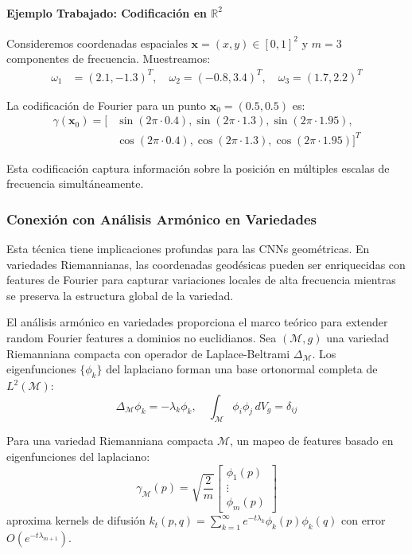 \paragraph{Ejemplo Trabajado: Codificación en $\mathbb{R}^2$}

Consideremos coordenadas espaciales $\mathbf{x} = (x, y) \in [0, 1]^2$ y $m = 3$ componentes de frecuencia. Muestreamos:
\begin{align}
\omega_1 &= (2.1, -1.3)^T, \quad \omega_2 = (-0.8, 3.4)^T, \quad \omega_3 = (1.7, 2.2)^T
\end{align}

La codificación de Fourier para un punto $\mathbf{x}_0 = (0.5, 0.5)$ es:
\begin{align}
\gamma(\mathbf{x}_0) = [&\sin(2\pi \cdot 0.4), \sin(2\pi \cdot 1.3), \sin(2\pi \cdot 1.95), \\
&\cos(2\pi \cdot 0.4), \cos(2\pi \cdot 1.3), \cos(2\pi \cdot 1.95)]^T
\end{align}

Esta codificación captura información sobre la posición en múltiples escalas de frecuencia simultáneamente.

\subsubsection{Conexión con Análisis Armónico en Variedades}

Esta técnica tiene implicaciones profundas para las CNNs geométricas. En variedades Riemannianas, las coordenadas geodésicas pueden ser enriquecidas con features de Fourier para capturar variaciones locales de alta frecuencia mientras se preserva la estructura global de la variedad.

El análisis armónico en variedades proporciona el marco teórico para extender random Fourier features a dominios no euclidianos. Sea $(\mathcal{M}, g)$ una variedad Riemanniana compacta con operador de Laplace-Beltrami $\Delta_{\mathcal{M}}$. Los eigenfunciones $\{\phi_k\}$ del laplaciano forman una base ortonormal completa de $L^2(\mathcal{M})$:
\begin{equation}
\Delta_{\mathcal{M}} \phi_k = -\lambda_k \phi_k, \quad \int_{\mathcal{M}} \phi_i \phi_j \, dV_g = \delta_{ij}
\end{equation}

\begin{proposition}
Para una variedad Riemanniana compacta $\mathcal{M}$, un mapeo de features basado en eigenfunciones del laplaciano:
\begin{equation}
\gamma_{\mathcal{M}}(p) = \sqrt{\frac{2}{m}} \begin{bmatrix} \phi_1(p) \\ \vdots \\ \phi_m(p) \end{bmatrix}
\end{equation}
aproxima kernels de difusión $k_t(p, q) = \sum_{k=1}^\infty e^{-t\lambda_k} \phi_k(p)\phi_k(q)$ con error $O(e^{-t\lambda_{m+1}})$.
\end{proposition}

